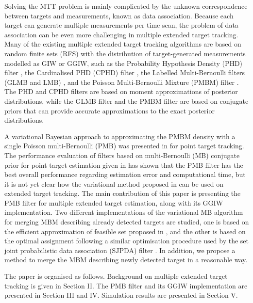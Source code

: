\documentclass[conference]{IEEEtran}
\begin{document}
Solving the MTT problem is mainly complicated by the unknown correspondence between targets and measurements, known as data association. Because each target can generate multiple measurements per time scan, the problem of data association can be even more challenging in multiple extended target tracking. Many of the existing multiple extended target tracking algorithms are based on random finite sets (RFS) \cite{rfs} with the distribution of target-generated measurements modelled as GIW or GGIW, such as the Probability Hypothesis Density (PHD) filter \cite{phdextended2,phdextended3}, the Cardinalised PHD (CPHD) filter \cite{cphdextended}, the Labelled Multi-Bernoulli filters (GLMB and LMB) \cite{lmbextended}, and the Poisson Multi-Bernoulli Mixture (PMBM) filter \cite{pmbmextended,pmbmextended2}. The PHD and CPHD filters are based on moment approximations of posterior distributions, while the GLMB filter and the PMBM filter are based on conjugate priors that can provide accurate approximations to the exact posterior distributions. 

A variational Bayesian approach to approximating the PMBM density with a single Poisson multi-Bernoulli (PMB) was presented in \cite{variational} for point target tracking. The performance evaluation of filters based on multi-Bernoulli (MB) conjugate prior for point target estimation given in \cite{performanceevaluation} has shown that the PMB filter has the best overall performance regarding estimation error and computational time, but it is not yet clear how the variational method proposed in \cite{variational} can be used on extended target tracking. The main contribution of this paper is presenting the PMB filter for multiple extended target estimation, along with its GGIW implementation. Two different implementations of the variational MB algorithm for merging MBM describing already detected targets are studied, one is based on the efficient approximation of feasible set proposed in \cite{variational}, and the other is based on the optimal assignment following a similar optimisation procedure used by the set joint probabilistic data association (SJPDA) filter \cite{sjpda}. In addition, we propose a method to merge the MBM describing newly detected target in a reasonable way. 

The paper is organised as follows. Background on multiple extended target tracking is given in Section II. The PMB filter and its GGIW implementation are presented in Section III and IV. Simulation results are presented in Section V.
\end{document}
